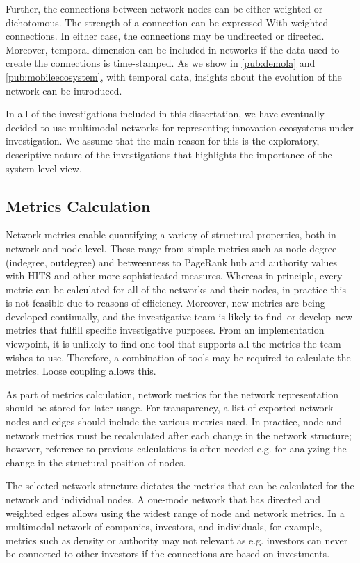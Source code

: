 Further, the connections between network nodes can be either weighted or dichotomous. The strength of a connection can be expressed With weighted connections. In either case, the connections may be undirected or directed. Moreover, temporal dimension can be included in networks if the data used to create the connections is time-stamped. As we show in \ref{pub:demola} and \ref{pub:mobileecosystem}, with temporal data, insights about the evolution of the network can be introduced.

In all of the investigations included in this dissertation, we have eventually decided to use multimodal networks for representing innovation ecosystems under investigation. We assume that the main reason for this is the exploratory, descriptive nature of the investigations that highlights the importance of the system-level view. 

\subsection{Metrics Calculation}

Network metrics enable quantifying a variety of structural properties, both in network and node level. These range from simple metrics such as node degree (indegree, outdegree) and betweenness to PageRank \citep{Page1999TheWeb} hub and authority values with HITS \citep{Kleinberg1999AuthoritativeEnvironment} and other more sophisticated measures. Whereas in principle, every metric can be calculated for all of the networks and their nodes, in practice this is not feasible due to reasons of efficiency. Moreover, new metrics are being developed continually, and the investigative team is likely to find--or develop--new metrics that fulfill specific investigative purposes. From an implementation viewpoint, it is unlikely to find one tool that supports all the metrics the team wishes to use. Therefore, a combination of tools may be required to calculate the metrics. Loose coupling allows this.

As part of metrics calculation, network metrics for the network representation should be stored for later usage. For transparency, a list of exported network nodes and edges should include the various metrics used. In practice, node and network metrics must be recalculated after each change in the network structure; however, reference to previous calculations is often needed e.g. for analyzing the change in the structural position of nodes.

The selected network structure dictates the metrics that can be calculated for the network and individual nodes. A one-mode network that has directed and weighted edges allows using the widest range of node and network metrics. In a multimodal network of companies, investors, and individuals, for example, metrics such as density or authority may not relevant as e.g. investors can never be connected to other investors if the connections are based on investments.

